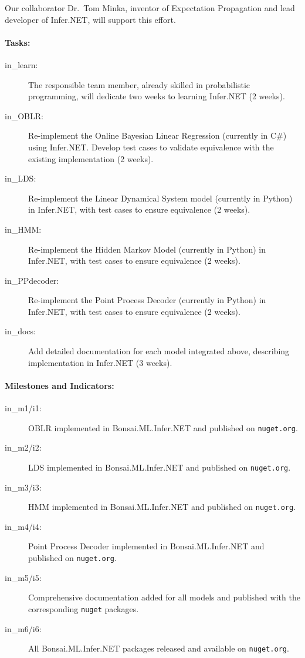 Our collaborator Dr.~Tom Minka, inventor of Expectation Propagation and lead
developer of Infer.NET, will support this effort.  

\paragraph{Tasks:}  

\begin{description}
    \item[in\_learn:] The responsible team member, already skilled in probabilistic programming, will dedicate two weeks to learning Infer.NET (2 weeks).  

    \item[in\_OBLR:] Re-implement the Online Bayesian Linear Regression (currently in C\#) using Infer.NET. Develop test cases to validate equivalence with the existing implementation (2 weeks).  

    \item[in\_LDS:] Re-implement the Linear Dynamical System model (currently in Python) in Infer.NET, with test cases to ensure equivalence (2 weeks).  

    \item[in\_HMM:] Re-implement the Hidden Markov Model (currently in Python) in Infer.NET, with test cases to ensure equivalence (2 weeks).  

    \item[in\_PPdecoder:] Re-implement the Point Process Decoder (currently in Python) in Infer.NET, with test cases to ensure equivalence (2 weeks).  

    \item[in\_docs:] Add detailed documentation for each model integrated above, describing implementation in Infer.NET (3 weeks).  

\end{description}  

\paragraph{Milestones and Indicators:}  

\begin{description}
    \item[in\_m1/i1:] OBLR implemented in Bonsai.ML.Infer.NET and published on \texttt{nuget.org}.  
    \item[in\_m2/i2:] LDS implemented in Bonsai.ML.Infer.NET and published on \texttt{nuget.org}.  
    \item[in\_m3/i3:] HMM implemented in Bonsai.ML.Infer.NET and published on \texttt{nuget.org}.  
    \item[in\_m4/i4:] Point Process Decoder implemented in Bonsai.ML.Infer.NET and published on \texttt{nuget.org}.  
    \item[in\_m5/i5:] Comprehensive documentation added for all models and published with the corresponding \texttt{nuget} packages.  
    \item[in\_m6/i6:] All Bonsai.ML.Infer.NET packages released and available on \texttt{nuget.org}.  
\end{description}


